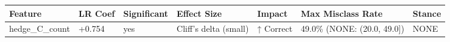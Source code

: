 \begin{tabular}{lllllll}
\toprule
Feature & LR Coef & Significant & Effect Size & Impact & Max Misclass Rate & Stance \\
\midrule
hedge\_C\_count & +0.754 & yes & Cliff's delta (small) & ↑ Correct & 49.0\% (NONE: (20.0, 49.0]) & NONE \\
\bottomrule
\end{tabular}
